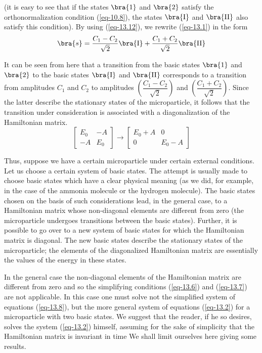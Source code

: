 \documentclass[a4paper,sfsidenotes,colorlinks=true]{tufte-book}
\numberwithin{equation}{section}
\numberwithin{figure}{section}
\begin{document}
(it is easy to see that if the states $\bra{1}$ and $\bra{2}$ satisfy
the orthonormalization condition (\ref{eq-10.8}), the states
$\bra{\mathrm{I}}$ and $\bra{\mathrm{II}}$ also satisfy this
condition). By using (\ref{eq-13.12}), we rewrite (\ref{eq-13.1}) in the form
\begin{equation}
\bra{s} = \frac{C_{1}- C_{2}}{\sqrt{2}}\bra{\mathrm{I}} +  \frac{C_{1}+ C_{2}}{\sqrt{2}}\bra{\mathrm{II}} 
\label{eq-13.13}
\end{equation}

It can be seen from here that a transition from the basic states
$\bra{1}$ and $\bra{2}$ to the basic states $\bra{\mathrm{I}}$ and
$\bra{\mathrm{II}}$ corresponds to a transition from amplitudes
$C_{1}$ and $C_{2}$ to amplitudes $\left( \dfrac{C_{1} -
    C_{2}}{\sqrt{2}} \right)$
and $\left( \dfrac{C_{1} + C_{2}}{\sqrt{2}}\right)$. Since the latter describe the
stationary states of the microparticle, it follows that the transition
under consideration is associated with a diagonalization of the
Hamiltonian matrix.
\begin{equation*}
\begin{bmatrix}
E_{0} & -A \\
-A & E_{0} 
\end{bmatrix}
\to 
\begin{bmatrix}
E_{0}+A & 0 \\
0 & E_{0}-A
\end{bmatrix}
\end{equation*}

Thus, suppose we have a certain microparticle under certain external
conditions. Let us choose a certain system of basic states. The
attempt is usually made to choose basic states which have a clear
physical meaning (as we did, for example, in the case of the ammonia
molecule or the hydrogen molecule). The basic states chosen on the
basis of such considerations lead, in the general case, to a
Hamiltonian matrix whose non-diagonal elements are different from zero
(the microparticle undergoes transitions between the basic
states). Further, it is possible to go over to a new system of basic
states for which the Hamiltonian matrix is diagonal. The new basic
states describe the stationary states of the microparticle; the
elements of the diagonalized Hamiltonian matrix are essentially the
values of the energy in these states.


In the general case the non-diagonal elements
of the Hamiltonian matrix are different from zero and so the
simplifying conditions (\ref{eq-13.6}) and (\ref{eq-13.7}) are not
applicable. In this case one must solve not the simplified system of
equations (\ref{eq-13.8}), but the more general system of equations
(\ref{eq-13.2}) for a microparticle with two basic states. We suggest
that the reader, if he so desires, solves the system (\ref{eq-13.2})
himself, assuming for the sake of simplicity that the Hamiltonian
matrix is invariant in time We shall limit ourselves
here giving some results.
\end{document}
